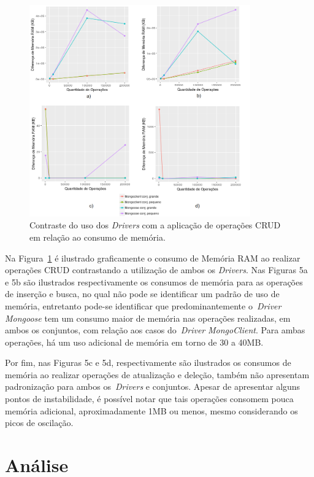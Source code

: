 \documentclass{svproc}
\begin{document}
\begin{figure}[!ht]
    \centering
    \includegraphics[width=0.85\textwidth]{images/memory}
	 \caption{Contraste do uso dos \emph{Drivers} com a aplicação de operações CRUD em relação ao consumo de memória.}
    \label{fig:memory}
\end{figure}

Na Figura~\ref{fig:memory} é ilustrado graficamente o consumo de Memória RAM ao realizar operações CRUD contrastando a utilização de ambos os \emph{Drivers}.
Nas Figuras 5a e 5b são ilustrados respectivamente os consumos de memória para as operações de inserção e busca, no qual não pode se identificar um padrão de uso de memória, entretanto pode-se identificar que predominantemente o~\emph{Driver} \emph{Mongoose} tem um consumo maior de memória nas operações realizadas, em ambos os conjuntos, com relação aos casos do~\emph{Driver} \emph{MongoClient}.
Para ambas operações, há um uso adicional de memória em torno de 30 a 40MB.

Por fim, nas Figuras 5c e 5d, respectivamente são ilustrados os consumos de memória ao realizar operações de atualização e deleção, também não apresentam padronização para ambos os~\emph{Drivers} e conjuntos. 
Apesar de apresentar alguns pontos de instabilidade, é possível notar que tais operações consomem pouca memória adicional, aproximadamente 1MB ou menos, mesmo considerando os picos de oscilação.

\section{Análise}
\label{section:discussao}
\end{document}
